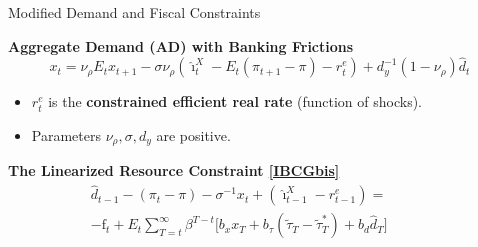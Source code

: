 \documentclass[11pt,aspectratio=169]{beamer}
\begin{document}
\begin{frame}{Modified Demand and Fiscal Constraints}
\small

\textbf{Aggregate Demand (AD) with Banking Frictions}
\begin{equation}
  x_{t}=\nu _{\rho }E_{t}x_{t+1}-\sigma \nu _{\rho }(\hat{\imath}_{t}^{X}-E_{t}(\pi _{t+1}-\pi )-r_{t}^{e}) + d_{y}^{-1}(1-\nu _{\rho })\hat{d}_{t} \label{ADfinal}
\end{equation}
\vspace{-0.2cm}
\footnotesize
\begin{itemize}
    \item $r_{t}^{e}$ is the \textbf{constrained efficient real rate} (function of shocks).
    \item Parameters $\nu_{\rho}, \sigma, d_{y}$ are positive.
\end{itemize}

\vspace{0.1cm}
\small
\textbf{The Linearized Resource Constraint \eqref{IBCGbis}}
\begin{equation}
\begin{split}
  \hat{d}_{t-1}-(\pi _{t}-\pi )-\sigma ^{-1}x_{t}+(\hat{\imath}_{t-1}^{X}-r_{t-1}^{e}) = \quad\quad\quad \\
   -\mathrm{f}_{t} + E_{t}\sum_{T=t}^{\infty }\beta ^{T-t}\Big[ b_{x}x_{T}+b_{\tau }(\tilde{\tau}_{T}-\tilde{\tau}_{T}^{\ast })+b_{d}\hat{d}_{T} \Big]
\end{split}
\label{IBCGlin}
\end{equation}

\end{frame}
\end{document}
